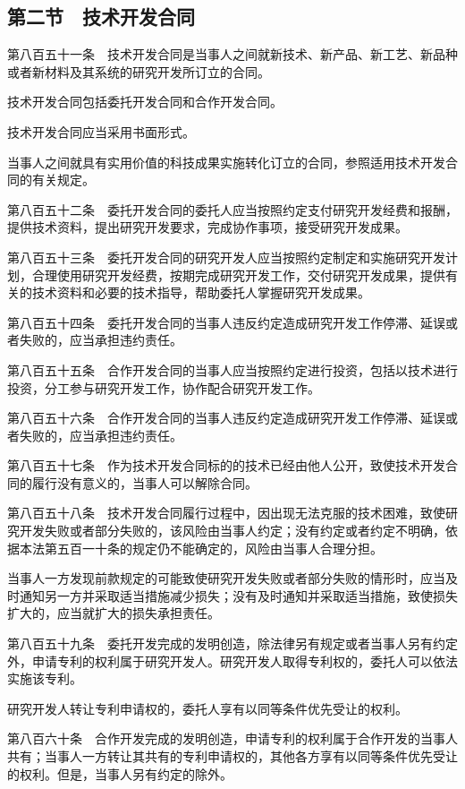 \documentclass[UTF8,12pt,a4paper]{ctexbook}
\begin{document}
\subsection*{第二节　技术开发合同}

第八百五十一条　技术开发合同是当事人之间就新技术、新产品、新工艺、新品种或者新材料及其系统的研究开发所订立的合同。

技术开发合同包括委托开发合同和合作开发合同。

技术开发合同应当采用书面形式。

当事人之间就具有实用价值的科技成果实施转化订立的合同，参照适用技术开发合同的有关规定。

第八百五十二条　委托开发合同的委托人应当按照约定支付研究开发经费和报酬，提供技术资料，提出研究开发要求，完成协作事项，接受研究开发成果。

第八百五十三条　委托开发合同的研究开发人应当按照约定制定和实施研究开发计划，合理使用研究开发经费，按期完成研究开发工作，交付研究开发成果，提供有关的技术资料和必要的技术指导，帮助委托人掌握研究开发成果。

第八百五十四条　委托开发合同的当事人违反约定造成研究开发工作停滞、延误或者失败的，应当承担违约责任。

第八百五十五条　合作开发合同的当事人应当按照约定进行投资，包括以技术进行投资，分工参与研究开发工作，协作配合研究开发工作。

第八百五十六条　合作开发合同的当事人违反约定造成研究开发工作停滞、延误或者失败的，应当承担违约责任。

第八百五十七条　作为技术开发合同标的的技术已经由他人公开，致使技术开发合同的履行没有意义的，当事人可以解除合同。

第八百五十八条　技术开发合同履行过程中，因出现无法克服的技术困难，致使研究开发失败或者部分失败的，该风险由当事人约定；没有约定或者约定不明确，依据本法第五百一十条的规定仍不能确定的，风险由当事人合理分担。

当事人一方发现前款规定的可能致使研究开发失败或者部分失败的情形时，应当及时通知另一方并采取适当措施减少损失；没有及时通知并采取适当措施，致使损失扩大的，应当就扩大的损失承担责任。

第八百五十九条　委托开发完成的发明创造，除法律另有规定或者当事人另有约定外，申请专利的权利属于研究开发人。研究开发人取得专利权的，委托人可以依法实施该专利。

研究开发人转让专利申请权的，委托人享有以同等条件优先受让的权利。

第八百六十条　合作开发完成的发明创造，申请专利的权利属于合作开发的当事人共有；当事人一方转让其共有的专利申请权的，其他各方享有以同等条件优先受让的权利。但是，当事人另有约定的除外。
\end{document}
